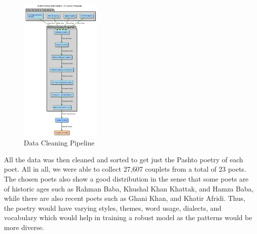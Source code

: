 \begin{figure}[H]
    \centering
    \includegraphics[width=0.35\textwidth]{datapipeline.png}
    \caption{Data Cleaning Pipeline}
    \label{fig:data-pipeline}
\end{figure}

All the data was then cleaned and sorted to get just the Pashto poetry of each poet. All in all, we were able to collect 27,607 couplets from a total of 23 poets. The chosen poets also show a good distribution in the sense that some poets are of historic ages such as Rahman Baba, Khushal Khan Khattak, and Hamza Baba, while there are also recent poets such as Ghani Khan, and Khatir Afridi. Thus, the poetry would have varying styles, themes, word usage, dialects, and vocabulary which would help in training a robust model as the patterns would be more diverse. 


